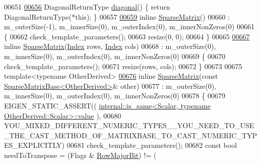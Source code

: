 \begin{DoxyCode}
00651     
\hyperlink{group___sparse_core___module_af83005640c2771ebd69f98848720ee52}{00656}     DiagonalReturnType \hyperlink{group___sparse_core___module_af83005640c2771ebd69f98848720ee52}{diagonal}() \{ \textcolor{keywordflow}{return} DiagonalReturnType(*\textcolor{keyword}{this}); \}
00657 
\hyperlink{group___sparse_core___module_a68087ee333c9614ea28850ec52069079}{00659}     \textcolor{keyword}{inline} \hyperlink{group___sparse_core___module_a68087ee333c9614ea28850ec52069079}{SparseMatrix}()
00660       : m\_outerSize(-1), m\_innerSize(0), m\_outerIndex(0), m\_innerNonZeros(0)
00661     \{
00662       check\_template\_parameters();
00663       resize(0, 0);
00664     \}
00665 
\hyperlink{group___sparse_core___module_a6abf1015a0243be97648e106a17b01ea}{00667}     \textcolor{keyword}{inline} \hyperlink{group___sparse_core___module_a6abf1015a0243be97648e106a17b01ea}{SparseMatrix}(\hyperlink{group___core___module_a554f30542cc2316add4b1ea0a492ff02}{Index} rows, \hyperlink{group___core___module_a554f30542cc2316add4b1ea0a492ff02}{Index} cols)
00668       : m\_outerSize(0), m\_innerSize(0), m\_outerIndex(0), m\_innerNonZeros(0)
00669     \{
00670       check\_template\_parameters();
00671       resize(rows, cols);
00672     \}
00673 
00675     \textcolor{keyword}{template}<\textcolor{keyword}{typename} OtherDerived>
\hyperlink{group___sparse_core___module_a501a50f0d7d58dc4c1d990cd912f581f}{00676}     \textcolor{keyword}{inline} \hyperlink{group___sparse_core___module_a501a50f0d7d58dc4c1d990cd912f581f}{SparseMatrix}(\textcolor{keyword}{const} \hyperlink{group___sparse_core___module_class_eigen_1_1_sparse_matrix_base}{SparseMatrixBase<OtherDerived>}& 
      other)
00677       : m\_outerSize(0), m\_innerSize(0), m\_outerIndex(0), m\_innerNonZeros(0)
00678     \{
00679       EIGEN\_STATIC\_ASSERT((
      \hyperlink{struct_eigen_1_1internal_1_1is__same}{internal::is\_same<Scalar, typename OtherDerived::Scalar>::value}
      ),
00680         
      YOU\_MIXED\_DIFFERENT\_NUMERIC\_TYPES\_\_YOU\_NEED\_TO\_USE\_THE\_CAST\_METHOD\_OF\_MATRIXBASE\_TO\_CAST\_NUMERIC\_TYPES\_EXPLICITLY)
00681       check\_template\_parameters();
00682       \textcolor{keyword}{const} \textcolor{keywordtype}{bool} needToTranspose = (Flags & \hyperlink{group__flags_gae4f56c2a60bbe4bd2e44c5b19cbe8762}{RowMajorBit}) != (

\end{DoxyCode}
